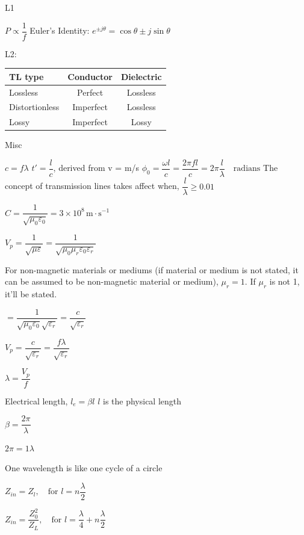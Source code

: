 \documentclass{book}
\begin{document}
L1

\begin{outline}
	\1 $P \propto \dfrac{1}{f}$
	\1 Euler's Identity: $e^{\pm j\theta} = \cos \theta \pm j\sin\theta$
\end{outline}

L2:

\begin{table}
	\centering
	\begin{tabular}{l|cc}
		\textbf{TL type} & \textbf{Conductor} & \textbf{Dielectric} \\ \bottomrule
		Lossless         & Perfect            & Lossless            \\
		Distortionless   & Imperfect          & Lossless            \\
		Lossy            & Imperfect          & Lossy               \\
	\end{tabular}
\end{table}

Misc

\begin{outline}
	\1 $c = f\lambda$
	\1 $t' = \dfrac{l}{c}$, derived from v = m/s
	\1 $\phi_0=\dfrac{\omega l}{c}=\dfrac{2\pi fl}{c}=2\pi\dfrac{l}{\lambda}\quad\mathrm{radians}$
	\1 The concept of transmission lines takes affect when, $\dfrac{l}{\lambda} \geq 0.01$

	\1 $C = \dfrac{1}{\sqrt{\mu_0 \varepsilon_0}} = 3 \times 10^8 \, \text{m} \cdot \text{s}^{-1}$

	\1 $V_p = \dfrac{1}{\sqrt{\mu \varepsilon}} = \dfrac{1}{\sqrt{\mu_0 \mu_r \varepsilon_0 \varepsilon_r}}$

	For non-magnetic materials or mediums (if material or medium is not stated, it can be assumed to be non-magnetic material or medium), $\mu_r = 1$. If $\mu_r$ is not 1, it'll be stated.

	$= \dfrac{1}{\sqrt{\mu_0 \varepsilon_0} \sqrt{\varepsilon_r}} = \dfrac{c}{\sqrt{\varepsilon_r}}$

	\1 $
		V_p
		= \dfrac{c}{\sqrt{\varepsilon_r}}
		= \dfrac{f\lambda}{\sqrt{\varepsilon_r}}
	$

	\1 $\lambda = \dfrac{V_p}{f}$

	\1 Electrical length, $l_e = \beta l$
	\2 $l$ is the physical length

	\1 $\beta = \dfrac{2 \pi}{\lambda}$

	\1 $2\pi = 1 \lambda$

	\2 One wavelength is like one cycle of a circle

	\1 $Z_{in} = Z_l, \quad \text{for } l = n \dfrac{\lambda}{2} $

	\1  $Z_{in} = \dfrac{Z_0^2}{Z_L}, \quad \text{for } l = \dfrac{\lambda}{4} + n \dfrac{\lambda}{2} $
\end{outline}
\end{document}
